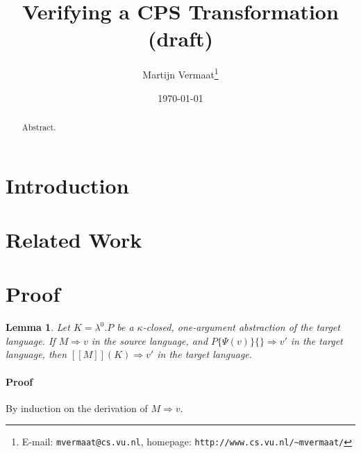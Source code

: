 \documentclass[a4paper,11pt]{article}
\title{Verifying a CPS Transformation (draft)}
\author{Martijn Vermaat\footnote{E-mail: \texttt{mvermaat@cs.vu.nl},
    homepage: \texttt{http://www.cs.vu.nl/\~{}mvermaat/}}}
\date{\today}
\newtheorem{lemma}{Lemma}
\begin{document}
\maketitle


\begin{abstract}
  Abstract.
\end{abstract}


\section{Introduction}\label{sec:introduction}


\section{Related Work}\label{sec:related}


\section{Proof}\label{sec:proof}

\begin{lemma}
  Let $K = \lambda^{0}.P$ be a $\kappa$-closed, one-argument
  abstraction of the target language. If $M \Rightarrow v$ in the
  source language, and $P\{\Psi(v)\}\{\} \Rightarrow v'$ in the target
  language, then $[\![M]\!](K) \Rightarrow v'$ in the target language.
\end{lemma}

\paragraph{Proof}

By induction on the derivation of $M \Rightarrow v$.

\end{document}
